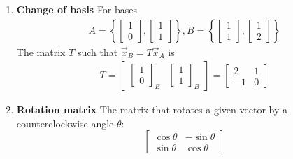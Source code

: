 \documentclass[10pt]{article}
\begin{document}
\begin{multicols}{2}
\begin{enumerate}
    \item \textbf{Change of basis}     
    For bases
    \begin{align*}
        A= \left\{ \begin{bmatrix} 1 \\ 0 \end{bmatrix}, \begin{bmatrix} 1 \\ 1 \end{bmatrix} \right\}, 
        B= \left\{ \begin{bmatrix} 1 \\ 1 \end{bmatrix}, \begin{bmatrix} 1 \\ 2 \end{bmatrix} \right\}
    \end{align*}
    The matrix $T$ such that $\vec{x}_B=T\vec{x}_A$ is 
    \begin{align*}
        T=\begin{bmatrix}
        \begin{bmatrix} 1 \\ 0 \end{bmatrix}_B & \begin{bmatrix} 1 \\ 1 \end{bmatrix}_B 
        \end{bmatrix} =
        \begin{bmatrix}
        2 & 1 \\ -1 & 0 
        \end{bmatrix}
    \end{align*}
    
    \item \textbf{Rotation matrix} The matrix that rotates a given vector by a counterclockwise angle $\theta$: 
    \begin{equation*}
        \begin{bmatrix} 
        \cos{\theta} & -\sin{\theta} \\
        \sin{\theta} & \cos{\theta}
        \end{bmatrix}
    \end{equation*}
\end{enumerate}

\end{multicols}
\end{document}
